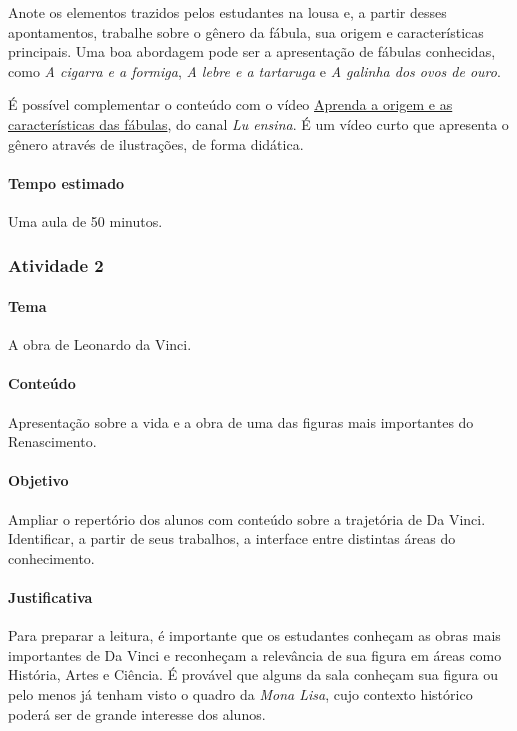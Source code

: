 \documentclass[11pt]{extarticle}
\begin{document}
Anote os elementos trazidos pelos estudantes na lousa e, a partir desses apontamentos, trabalhe sobre o gênero da fábula, sua origem e características principais. Uma boa abordagem pode ser a apresentação de fábulas conhecidas, como \textit{A cigarra e a formiga}, \textit{A lebre e a tartaruga} e \textit{A galinha dos ovos de ouro}.


É possível complementar o conteúdo com o vídeo \href{https://youtu.be/lGm0nfoRBiI}{Aprenda a origem e as características das fábulas}, do canal \textit{Lu ensina}. É um vídeo curto que apresenta o gênero através de ilustrações, de forma didática.

\paragraph{Tempo estimado} Uma aula de 50 minutos.

\subsubsection{Atividade 2}


\paragraph{Tema} A obra de Leonardo da Vinci.

\paragraph{Conteúdo} Apresentação sobre a vida e a obra de uma das figuras mais importantes do Renascimento.

\paragraph{Objetivo} Ampliar o repertório dos alunos com conteúdo sobre a trajetória de Da Vinci. Identificar, a partir de seus trabalhos, a interface entre distintas áreas do conhecimento.

\paragraph{Justificativa} Para preparar a leitura, é importante que os estudantes conheçam as obras mais importantes de Da Vinci e reconheçam a relevância de sua figura em áreas como História, Artes e Ciência. É provável que alguns da sala conheçam sua figura ou pelo menos já tenham visto o quadro da \textit{Mona Lisa}, cujo contexto histórico poderá ser de grande interesse dos alunos.
\end{document}
